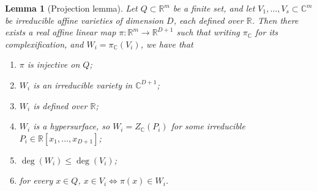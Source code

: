 \documentclass[11pt]{article}
\theoremstyle{plain}
\newtheorem{lemma}[theorem]{Lemma}
\theoremstyle{definition}
\begin{document}
	\begin{lemma}[Projection lemma]\label{lemma:projection}
		Let $Q\subset \mathbb{R}^m$ be a finite set, and let $V_1,\dots,V_s\subset \mathbb{C}^m$ be irreducible affine varieties of dimension $D$, each defined over $\mathbb{R}$. Then there exists a real affine linear map $\pi:\mathbb{R}^m\rightarrow \mathbb{R}^{D+1}$ such that writing $\pi_{\mathbb{C}}$ for its complexification, and $W_i=\pi_{\mathbb{C}}(V_i)$, we have that
		\begin{enumerate}
			\item $\pi$ is injective on $Q$;
			\item $W_i$ is an irreducible variety in $\mathbb{C}^{D+1}$;
			\item $W_i$ is defined over $\mathbb{R}$;
			\item $W_i$ is a hypersurface, so $W_i=Z_{\mathbb{C}}(P_i)$ for some irreducible $P_i\in \mathbb{R}[x_1,\dots,x_{D+1}]$;
			\item $\deg(W_i)\leq \deg(V_i)$;
			\item for every $x\in Q$, $x\in V_i \iff \pi(x)\in W_i$.
		\end{enumerate}
	\end{lemma}
	
\end{document}
